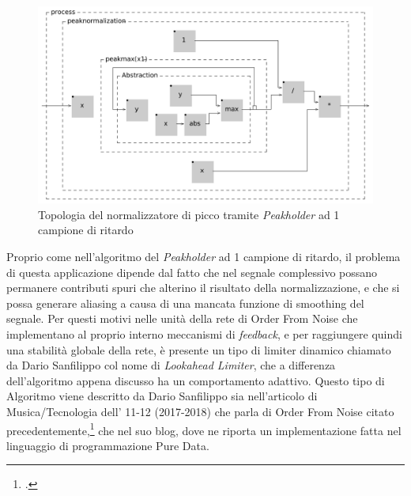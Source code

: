 \begin{figure}[h!]
\begin{center}
    \includegraphics[width=14cm]{figures/PeakNormalizationIIR.pdf}
    \caption {Topologia del normalizzatore di picco tramite \textit{Peakholder} ad 1 campione di ritardo}
\end{center}
\vspace{0.5cm}
\end{figure}
    
Proprio come nell'algoritmo del \textit{Peakholder} ad 1 campione di ritardo, 
il problema di questa applicazione dipende dal fatto che nel segnale
complessivo possano permanere contributi spuri che alterino il risultato
della normalizzazione, e che si possa generare aliasing a causa di una mancata
funzione di smoothing del segnale.
Per questi motivi nelle unità della rete di Order From Noise 
che implementano al proprio interno meccanismi di \emph{feedback},
e per raggiungere quindi una stabilità globale della rete,
è presente un tipo di limiter dinamico chiamato da Dario Sanfilippo
col nome di \textit{Lookahead Limiter}, che a differenza dell'algoritmo
appena discusso ha un comportamento adattivo.
Questo tipo di Algoritmo viene descritto da Dario Sanfilippo sia nell'articolo 
di Musica/Tecnologia dell' 11-12 (2017-2018) che parla di Order From Noise 
citato precedentemente,\footcite{sanfilippo_time-variant_2018}
che nel suo blog, dove ne riporta un implementazione fatta nel linguaggio di programmazione
Pure Data.

